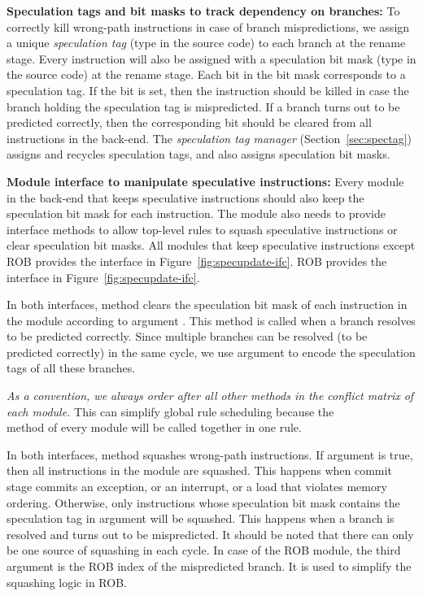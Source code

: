 \noindent\textbf{Speculation tags and bit masks to track dependency on branches:}
To correctly kill wrong-path instructions in case of branch mispredictions, we assign a unique \emph{speculation tag} (type  in the source code) to each branch at the rename stage.
Every instruction will also be assigned with a speculation bit mask (type  in the source code) at the rename stage.
Each bit in the bit mask corresponds to a speculation tag.
If the bit is set, then the instruction should be killed in case the branch holding the speculation tag is mispredicted.
If a branch turns out to be predicted correctly, then the corresponding bit should be cleared from all instructions in the back-end. 
The \emph{speculation tag manager} (Section~\ref{sec:spectag}) assigns and recycles speculation tags, and also assigns speculation bit masks.

\noindent\textbf{Module interface to manipulate speculative instructions:}
Every module in the back-end that keeps speculative instructions should also keep the speculation bit mask for each instruction.
The module also needs to provide interface methods to allow top-level rules to squash speculative instructions or clear speculation bit masks.
All modules that keep speculative instructions except ROB provides the  interface in Figure~\ref{fig:specupdate-ifc}.
ROB provides the  interface in Figure~\ref{fig:specupdate-ifc}.

In both interfaces, method  clears the speculation bit mask of each instruction in the module according to argument .
This method is called when a branch resolves to be predicted correctly.
Since multiple branches can be resolved (to be predicted correctly) in the same cycle, we use argument  to encode the speculation tags of all these branches.

\emph{As a convention, we always order  after all other methods in the conflict matrix of each module.}
This can simplify global rule scheduling because the\\  method of every module will be called together in one rule.

In both interfaces, method  squashes wrong-path instructions.
If argument  is true, then all instructions in the module are squashed.
This happens when commit stage commits an exception, or an interrupt, or a load that violates memory ordering.
Otherwise, only instructions whose speculation bit mask contains the speculation tag in argument  will be squashed.
This happens when a branch is resolved and turns out to be mispredicted.
It should be noted that there can only be one source of squashing in each cycle.
In case of the ROB module, the third argument  is the ROB index of the mispredicted branch.
It is used to simplify the squashing logic in ROB.

